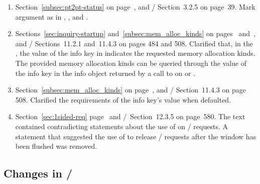 \begin{enumerate}
\item
  Section~\ref{subsec:pt2pt-status} on
  page~\pageref{subsec:pt2pt-status}, and \MPIIVDOTI/ Section~3.2.5 on page~39.
  \newline
  Mark  argument as  in ,
  , and .
  
\item
  Sections~\ref{sec:inquiry-startup} and~\ref{subsec:mem_alloc_kinds} on
  pages~\pageref{sec:inquiry-startup} and~\pageref{subsec:mem_alloc_kinds}, and
  \MPIIVDOTI/ Sections~11.2.1 and~11.4.3 on pages 484 and 508.
  \newline
  Clarified that, in the \wpm{}, the value of the 
  info key in  indicates the requested memory allocation kinds.
  The provided memory allocation kinds can be queried through the value of the 
  info key in the info object returned by a call to
   on  or .

\item
  Section~\ref{subsec:mem_alloc_kinds} on
  page~\pageref{subsec:mem_alloc_kinds}, and
  \MPIIVDOTI/ Section~11.4.3 on page 508.
  \newline
  Clarified the requirements of the 
  info key's value when defaulted.

\item 
  Section~\ref{sec:1sided-req} page~\pageref{sec:1sided-req} and \MPIIVDOTI/~Section~12.3.5 on page~580.
  \newline
  The text contained contradicting statements about the use of  on \RMA/ requests.
  A statement that suggested the use of  to release \RMA/ requests after the window has been flushed was removed.

\end{enumerate}

\subsection{Changes in \texorpdfstring{\MPIVDOTO/}{MPI-5.0}}
\label{subsec:changes-41-50}

